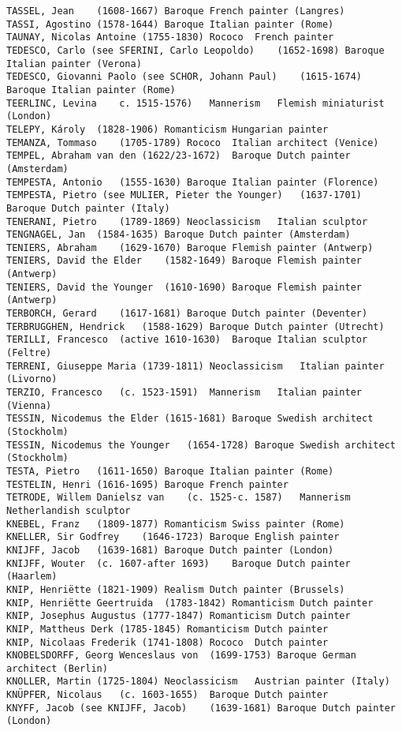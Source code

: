 \documentclass[11pt]{article}
\begin{document}
\begin{Verbatim}[commandchars=\\\{\}]
TASSEL, Jean	(1608-1667)	Baroque	French painter (Langres)
TASSI, Agostino	(1578-1644)	Baroque	Italian painter (Rome)
TAUNAY, Nicolas Antoine	(1755-1830)	Rococo	French painter
TEDESCO, Carlo (see SFERINI, Carlo Leopoldo)	(1652-1698)	Baroque	Italian painter (Verona)
TEDESCO, Giovanni Paolo (see SCHOR, Johann Paul)	(1615-1674)	Baroque	Italian painter (Rome)
TEERLINC, Levina	c. 1515-1576)	Mannerism	Flemish miniaturist (London)
TELEPY, Károly	(1828-1906)	Romanticism	Hungarian painter
TEMANZA, Tommaso	(1705-1789)	Rococo	Italian architect (Venice)
TEMPEL, Abraham van den	(1622/23-1672)	Baroque	Dutch painter (Amsterdam)
TEMPESTA, Antonio	(1555-1630)	Baroque	Italian painter (Florence)
TEMPESTA, Pietro (see MULIER, Pieter the Younger)	(1637-1701)	Baroque	Dutch painter (Italy)
TENERANI, Pietro	(1789-1869)	Neoclassicism	Italian sculptor
TENGNAGEL, Jan	(1584-1635)	Baroque	Dutch painter (Amsterdam)
TENIERS, Abraham	(1629-1670)	Baroque	Flemish painter (Antwerp)
TENIERS, David the Elder	(1582-1649)	Baroque	Flemish painter (Antwerp)
TENIERS, David the Younger	(1610-1690)	Baroque	Flemish painter (Antwerp)
TERBORCH, Gerard	(1617-1681)	Baroque	Dutch painter (Deventer)
TERBRUGGHEN, Hendrick	(1588-1629)	Baroque	Dutch painter (Utrecht)
TERILLI, Francesco	(active 1610-1630)	Baroque	Italian sculptor (Feltre)
TERRENI, Giuseppe Maria	(1739-1811)	Neoclassicism	Italian painter (Livorno)
TERZIO, Francesco	(c. 1523-1591)	Mannerism	Italian painter (Vienna)
TESSIN, Nicodemus the Elder	(1615-1681)	Baroque	Swedish architect (Stockholm)
TESSIN, Nicodemus the Younger	(1654-1728)	Baroque	Swedish architect (Stockholm)
TESTA, Pietro	(1611-1650)	Baroque	Italian painter (Rome)
TESTELIN, Henri	(1616-1695)	Baroque	French painter
TETRODE, Willem Danielsz van	(c. 1525-c. 1587)	Mannerism	Netherlandish sculptor
KNEBEL, Franz	(1809-1877)	Romanticism	Swiss painter (Rome)
KNELLER, Sir Godfrey	(1646-1723)	Baroque	English painter
KNIJFF, Jacob	(1639-1681)	Baroque	Dutch painter (London)
KNIJFF, Wouter	(c. 1607-after 1693)	Baroque	Dutch painter (Haarlem)
KNIP, Henriëtte	(1821-1909)	Realism	Dutch painter (Brussels)
KNIP, Henriëtte Geertruida	(1783-1842)	Romanticism	Dutch painter
KNIP, Josephus Augustus	(1777-1847)	Romanticism	Dutch painter
KNIP, Mattheus Derk	(1785-1845)	Romanticism	Dutch painter
KNIP, Nicolaas Frederik	(1741-1808)	Rococo	Dutch painter
KNOBELSDORFF, Georg Wenceslaus von	(1699-1753)	Baroque	German architect (Berlin)
KNOLLER, Martin	(1725-1804)	Neoclassicism	Austrian painter (Italy)
KNÜPFER, Nicolaus	(c. 1603-1655)	Baroque	Dutch painter
KNYFF, Jacob (see KNIJFF, Jacob)	(1639-1681)	Baroque	Dutch painter (London)

\end{Verbatim}
\end{document}
